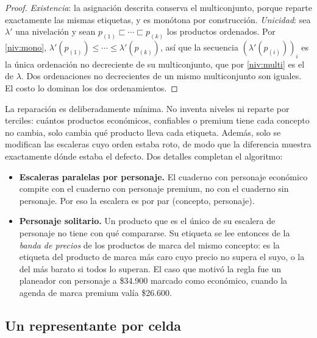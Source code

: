\begin{proof}
\emph{Existencia}: la asignación descrita conserva el multiconjunto, porque
reparte exactamente las mismas etiquetas, y es monótona por construcción.
\emph{Unicidad}: sea $\lambda'$ una nivelación y sean $p_{(1)}\sqsubset\cdots
\sqsubset p_{(k)}$ los productos ordenados. Por \ref{niv:mono},
$\lambda'(p_{(1)})\leq\cdots\leq\lambda'(p_{(k)})$, así que la secuencia
$(\lambda'(p_{(i)}))_i$ es la única ordenación no decreciente de su
multiconjunto, que por \ref{niv:multi} es el de $\lambda$. Dos ordenaciones no
decrecientes de un mismo multiconjunto son iguales. El costo lo dominan los
dos ordenamientos.
\end{proof}

La reparación es deliberadamente mínima. No inventa niveles ni reparte por
terciles: cuántos productos económicos, confiables o premium tiene cada
concepto no cambia, solo cambia qué producto lleva cada etiqueta. Además,
solo se modifican las escaleras cuyo orden estaba roto, de modo que la
diferencia muestra exactamente dónde estaba el defecto. Dos detalles completan
el algoritmo:
\begin{itemize}
  \item \textbf{Escaleras paralelas por personaje.} El cuaderno con personaje
        económico compite con el cuaderno con personaje premium, no con el
        cuaderno sin personaje. Por eso la escalera es por par (concepto,
        personaje).
  \item \textbf{Personaje solitario.} Un producto que es el único de su
        escalera de personaje no tiene con qué compararse. Su etiqueta se lee
        entonces de la \emph{banda de precios} de los productos de marca del
        mismo concepto: es la etiqueta del producto de marca más caro cuyo
        precio no supera el suyo, o la del más barato si todos lo superan. El
        caso que motivó la regla fue un planeador con personaje a \$34.900
        marcado como económico, cuando la agenda de marca premium valía
        \$26.600.
\end{itemize}

\subsection{Un representante por celda}
\label{sec:cat-representantes}

